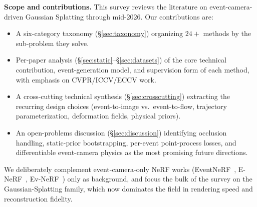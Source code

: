 \textbf{Scope and contributions.} This survey reviews the literature on event-camera-driven Gaussian Splatting through mid-2026. Our contributions are:
\begin{itemize}
    \item A six-category taxonomy (\S\ref{sec:taxonomy}) organizing $24+$ methods by the sub-problem they solve.
    \item Per-paper analysis (\S\ref{sec:static}--\S\ref{sec:datasets}) of the core technical contribution, event-generation model, and supervision form of each method, with emphasis on CVPR/ICCV/ECCV work.
    \item A cross-cutting technical synthesis (\S\ref{sec:crosscutting}) extracting the recurring design choices (event-to-image vs.\ event-to-flow, trajectory parameterization, deformation fields, physical priors).
    \item An open-problems discussion (\S\ref{sec:discussion}) identifying occlusion handling, static-prior bootstrapping, per-event point-process losses, and differentiable event-camera physics as the most promising future directions.
\end{itemize}

We deliberately complement event-camera-only NeRF works (EventNeRF~\cite{rudnev2023eventnerf}, E-NeRF~\cite{klenk2023enerf}, Ev-NeRF~\cite{hwang2023evnerf}) only as background, and focus the bulk of the survey on the Gaussian-Splatting family, which now dominates the field in rendering speed and reconstruction fidelity.
